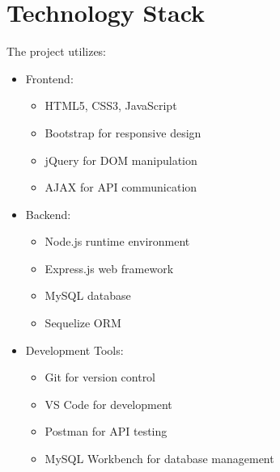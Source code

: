 \section{Technology Stack}
The project utilizes:
\begin{itemize}
    \item Frontend:
    \begin{itemize}
        \item HTML5, CSS3, JavaScript
        \item Bootstrap for responsive design
        \item jQuery for DOM manipulation
        \item AJAX for API communication
    \end{itemize}
    \item Backend:
    \begin{itemize}
        \item Node.js runtime environment
        \item Express.js web framework
        \item MySQL database
        \item Sequelize ORM
    \end{itemize}
    \item Development Tools:
    \begin{itemize}
        \item Git for version control
        \item VS Code for development
        \item Postman for API testing
        \item MySQL Workbench for database management
    \end{itemize}
\end{itemize}

